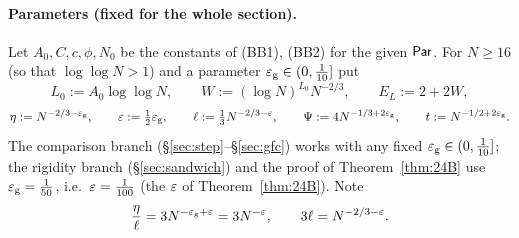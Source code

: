 \paragraph{Parameters (fixed for the whole section).} Let $A_0,C,c,\phi,N_0$ be the constants of (BB1), (BB2) for the given $\mathsf{Par}$. For
$N\ge16$ (so that $\log\log N>1$) and a parameter $\varepsilon_{\mathrm g}\in(0,\frac1{10}]$ put
\begin{equation}\label{eq:B2par}
L_0:=A_0\log\log N,\qquad W:=(\log N)^{L_0}N^{-2/3},\qquad E_L:=2+2W,
\end{equation}
\begin{equation}\label{eq:B2par2}
\eta:=N^{-2/3-\varepsilon_{\mathrm g}},\qquad \varepsilon:=\tfrac12\varepsilon_{\mathrm g},\qquad \ell:=\tfrac13N^{-2/3-\varepsilon},\qquad \Psi:=4N^{-1/3+2\varepsilon_{\mathrm g}},\qquad t:=N^{-1/2+2\varepsilon_{\mathrm g}}.
\end{equation}
The comparison branch (\S\ref{sec:step}--\S\ref{sec:gfc}) works with any fixed $\varepsilon_{\mathrm g}\in(0,\frac1{10}]$; the rigidity branch (\S\ref{sec:sandwich})
and the proof of Theorem~\ref{thm:24B} use $\varepsilon_{\mathrm g}=\frac1{50}$, i.e.\ $\varepsilon=\frac1{100}$ (the $\varepsilon$ of Theorem~\ref{thm:24B}). Note
\begin{equation}\label{eq:B2etaell}
\frac{\eta}{\ell}=3N^{-\varepsilon_{\mathrm g}+\varepsilon}=3N^{-\varepsilon},\qquad 3\ell=N^{-2/3-\varepsilon}.
\end{equation}

